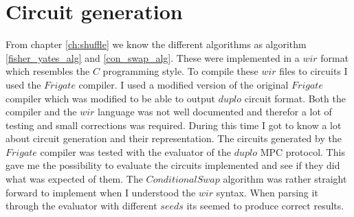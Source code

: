 \section{Circuit generation}
From chapter \ref{ch:shuffle} we know the different algorithms as algorithm \ref{fisher_yates_alg} and \ref{con_swap_alg}. These were implemented in a $wir$ format which resembles the $C$ programming style. To compile these $wir$ files to circuits I used the $Frigate$ compiler. I used a modified version of the original $Frigate$ compiler which was modified to be able to output $duplo$ circuit format. Both the compiler and the $wir$ language was not well documented and therefor a lot of testing and small corrections was required. During this time I got to know a lot about circuit generation and their representation. The circuits generated by the $Frigate$ compiler was tested with the evaluator of the $duplo$ MPC protocol. This gave me the possibility to evaluate the circuits implemented and see if they did what was expected of them. The $Conditional Swap$ algorithm was rather straight forward to implement when I understood the $wir$ syntax. When parsing it through the evaluator with different $seeds$ its seemed to produce correct results.


